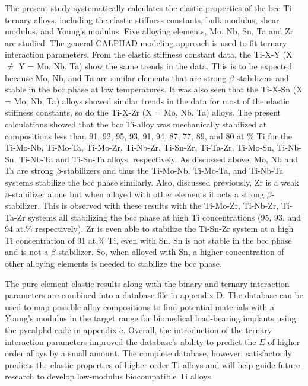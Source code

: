 The present study systematically calculates the elastic properties of the bcc Ti ternary alloys, including the elastic stiffness constants, bulk modulus, shear modulus, and Young's modulus. Five alloying elements, Mo, Nb, Sn, Ta and Zr are studied. The general CALPHAD modeling approach is used to fit ternary interaction parameters. From the elastic stiffness constant data, the Ti-X-Y (X $\neq$ Y = Mo, Nb, Ta) show the same trends in the data. This is to be expected because Mo, Nb, and Ta are similar elements that are strong $\beta$-stabilizers and stable in the bcc phase at low temperatures. It was also seen that the Ti-X-Sn (X = Mo, Nb, Ta) alloys showed similar trends in the data for most of the elastic stiffness constants, so do the Ti-X-Zr (X = Mo, Nb, Ta) alloys. The present calculations showed that the bcc Ti-alloy was mechanically stabilized at compositions less than 91, 92, 95, 93, 91, 94, 87, 77, 89, and 80 at \% Ti for the Ti-Mo-Nb, Ti-Mo-Ta, Ti-Mo-Zr, Ti-Nb-Zr, Ti-Sn-Zr, Ti-Ta-Zr, Ti-Mo-Sn, Ti-Nb-Sn, Ti-Nb-Ta and Ti-Sn-Ta alloys, respectively. As discussed above, Mo, Nb and Ta are strong $\beta$-stabilizers and thus the Ti-Mo-Nb, Ti-Mo-Ta, and Ti-Nb-Ta systems stabilize the bcc phase similarly. Also, discussed previously, Zr is a weak $\beta$-stabilizer alone but when alloyed with other elements it acts a strong $\beta$-stabilizer. This is observed with these results with the Ti-Mo-Zr, Ti-Nb-Zr, Ti-Ta-Zr systems all stabilizing the bcc phase at high Ti concentrations (95, 93, and 94 at.\% respectively). Zr is even able to stabilize the Ti-Sn-Zr system at a high Ti concentration of 91 at.\% Ti, even with Sn. Sn is not stable in the bcc phase and is not a $\beta$-stabilizer. So, when alloyed with Sn, a higher concentration of other alloying elements is needed to stabilize the bcc phase. 

The pure element elastic results along with the binary and ternary interaction parameters are combined into a database file in appendix D. The database can be used to map possible alloy compositions to find potential materials with a Young's modulus in the target range for biomedical load-bearing implants using the pycalphd code in appendix e. Overall, the introduction of the ternary interaction parameters improved the database's ability to predict the $E$ of higher order alloys by a small amount. The complete database, however, satisfactorily predicts the elastic properties of higher order Ti-alloys and will help guide future research to develop low-modulus biocompatible Ti alloys.


